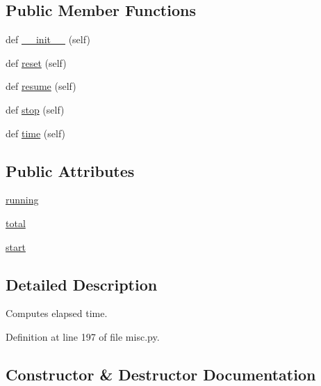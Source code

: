 \subsection*{Public Member Functions}
\begin{DoxyCompactItemize}
\item 
def \hyperlink{classparlai_1_1utils_1_1misc_1_1Timer_ae566c74592910671655a53eafaf8f92d}{\+\_\+\+\_\+init\+\_\+\+\_\+} (self)
\item 
def \hyperlink{classparlai_1_1utils_1_1misc_1_1Timer_a68bdf8abb3fe00edc639b21944d03371}{reset} (self)
\item 
def \hyperlink{classparlai_1_1utils_1_1misc_1_1Timer_a855f1e8a3ba03fe16712fd7ae49dab46}{resume} (self)
\item 
def \hyperlink{classparlai_1_1utils_1_1misc_1_1Timer_a5a7a90c124ef1b1b92a550606a3c93b9}{stop} (self)
\item 
def \hyperlink{classparlai_1_1utils_1_1misc_1_1Timer_a37214d0006ae44a19081c21a5a699ffb}{time} (self)
\end{DoxyCompactItemize}
\subsection*{Public Attributes}
\begin{DoxyCompactItemize}
\item 
\hyperlink{classparlai_1_1utils_1_1misc_1_1Timer_a05abf50b49c1e26baabe03a9daafa870}{running}
\item 
\hyperlink{classparlai_1_1utils_1_1misc_1_1Timer_a37214900a663640b33bdce9e6b3053dd}{total}
\item 
\hyperlink{classparlai_1_1utils_1_1misc_1_1Timer_a1c32e2a8785377c980bc4b125fe6db0d}{start}
\end{DoxyCompactItemize}


\subsection{Detailed Description}
\begin{DoxyVerb}Computes elapsed time.
\end{DoxyVerb}
 

Definition at line 197 of file misc.\+py.



\subsection{Constructor \& Destructor Documentation}
\mbox{\label{classparlai_1_1utils_1_1misc_1_1Timer_ae566c74592910671655a53eafaf8f92d}} 
